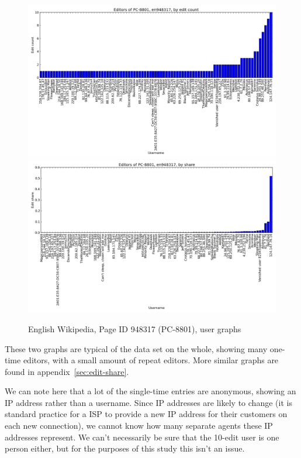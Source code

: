 \begin{figure}
  \centering
  \includegraphics[width=1\linewidth]{img/editshare/pc8801count.png}
  \newline
  \includegraphics[width=1\linewidth]{img/editshare/pc8801share.png}
  \caption{English Wikipedia, Page ID 948317 (PC-8801), user graphs}
  \label{fig:average-share}
\end{figure}

These two graphs are typical of the data set on the whole, showing
many one-time editors, with a small amount of repeat editors. More
similar graphs are found in appendix~\ref{sec:edit-share}.

We can note here that a lot of the single-time entries are anonymous,
showing an IP address rather than a username. Since IP addresses are
likely to change (it is standard practice for a ISP to provide a new
IP address for their customers on each new connection), we cannot know
how many separate agents these IP addresses represent. We can't
necessarily be sure that the 10-edit user is one person either, but
for the purposes of this study this isn't an issue.

